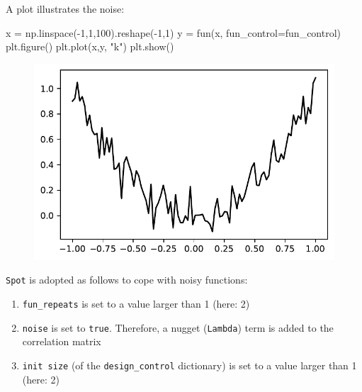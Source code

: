 \documentclass[
  letterpaper,
  DIV=11,
  numbers=noendperiod]{scrreprt}
\newenvironment{Shaded}{\begin{snugshade}}{\end{snugshade}}
\newcommand{\DecValTok}[1]{\textcolor[rgb]{0.68,0.00,0.00}{#1}}
\newcommand{\NormalTok}[1]{\textcolor[rgb]{0.00,0.23,0.31}{#1}}
\newcommand{\OperatorTok}[1]{\textcolor[rgb]{0.37,0.37,0.37}{#1}}
\newcommand{\StringTok}[1]{\textcolor[rgb]{0.13,0.47,0.30}{#1}}
\providecommand{\tightlist}{%
  \setlength{\itemsep}{0pt}\setlength{\parskip}{0pt}}\usepackage{longtable,booktabs,array}
\begin{document}
A plot illustrates the noise:

\begin{Shaded}
\begin{Highlighting}[]
\NormalTok{x }\OperatorTok{=}\NormalTok{ np.linspace(}\OperatorTok{{-}}\DecValTok{1}\NormalTok{,}\DecValTok{1}\NormalTok{,}\DecValTok{100}\NormalTok{).reshape(}\OperatorTok{{-}}\DecValTok{1}\NormalTok{,}\DecValTok{1}\NormalTok{)}
\NormalTok{y }\OperatorTok{=}\NormalTok{ fun(x, fun\_control}\OperatorTok{=}\NormalTok{fun\_control)}
\NormalTok{plt.figure()}
\NormalTok{plt.plot(x,y, }\StringTok{"k"}\NormalTok{)}
\NormalTok{plt.show()}
\end{Highlighting}
\end{Shaded}

\begin{figure}[H]

{\centering \includegraphics{014_num_spot_ocba_files/figure-pdf/cell-4-output-1.pdf}

}

\end{figure}

\texttt{Spot} is adopted as follows to cope with noisy functions:

\begin{enumerate}
\def\labelenumi{\arabic{enumi}.}
\tightlist
\item
  \texttt{fun\_repeats} is set to a value larger than 1 (here: 2)
\item
  \texttt{noise} is set to \texttt{true}. Therefore, a nugget
  (\texttt{Lambda}) term is added to the correlation matrix
\item
  \texttt{init\ size} (of the \texttt{design\_control} dictionary) is
  set to a value larger than 1 (here: 2)
\end{enumerate}
\end{document}
